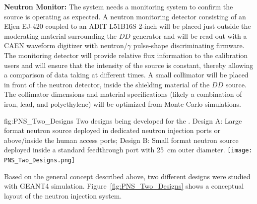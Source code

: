 {\bf Neutron Monitor:} The system needs a monitoring system to confirm the source is operating as expected.  A neutron monitoring detector consisting of an Eljen EJ-420 coupled to an ADIT L51B16S \num{2}-inch  will be placed just outside the moderating material surrounding the $DD$ generator and will be read out with a CAEN waveform digitizer with neutron/$\gamma$ pulse-shape discriminating firmware. The monitoring detector will provide relative flux information to the calibration users and will ensure that the intensity of the source is constant, thereby allowing a comparison of data taking at different times.  A small collimator will be placed in front of the neutron detector, inside the shielding material of the $DD$ source. The collimator dimensions and material specifications (likely a combination of iron, lead, and polyethylene) will be optimized from Monte Carlo simulations.

\begin{dunefigure}{fig:PNS_Two_Designs}
{Two designs being developed for the . Design A: Large format neutron source deployed in dedicated neutron injection ports or above/inside the human access ports; Design B: Small format neutron source deployed inside a standard feedthrough port with \SI{25}{\cm} outer diameter.}
\texttt{[image: PNS\_Two\_Designs.png]}
\end{dunefigure}

Based on the general concept described above, two different designs were studied with GEANT4 simulation. Figure~\ref{fig:PNS_Two_Designs} shows a conceptual layout of the neutron injection system. %


